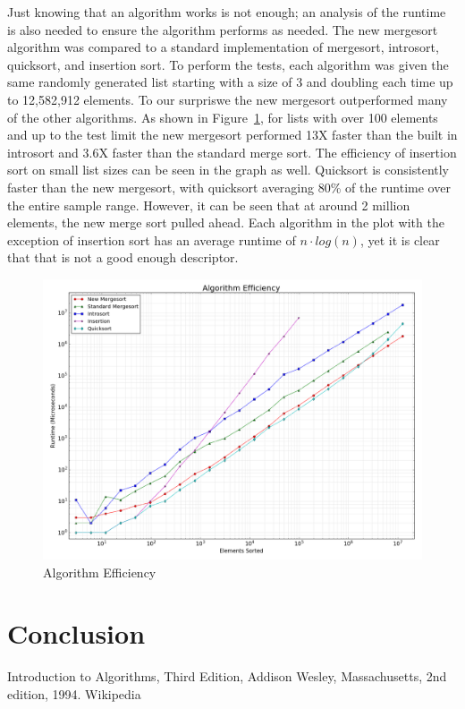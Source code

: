 \documentclass[12pt]{article}
\begin{document}
	Just knowing that an algorithm works is not enough; an analysis of the runtime is also needed to ensure the algorithm performs as needed. 
	The new mergesort algorithm was compared to a standard implementation of mergesort, introsort, quicksort, and insertion sort. 
	To perform the tests, each algorithm was given the same randomly generated list starting with a size of 3 and doubling each time up to 12,582,912 elements. 
	To our surpriswe the new mergesort outperformed many of the other algorithms. 
	As shown in Figure~\ref{fig:algeff}, for lists with over 100 elements and up to the test limit the new mergesort performed 13X faster than the built in introsort and 3.6X faster than the standard merge sort. 
	The efficiency of insertion sort on small list sizes can be seen in the graph as well. Quicksort is consistently faster than the new mergesort, with quicksort averaging 80\% of the runtime over the entire sample range. 
	However, it can be seen that at around 2 million elements, the new merge sort pulled ahead. 
	Each algorithm in the plot with the exception of insertion sort has an average runtime of $ n \cdot log (n) $, yet it is clear that that is not a good enough descriptor.

	\begin{figure}[H]
		\centering
		\includegraphics[width=6in]{figure_3.png}
		\caption{Algorithm Efficiency}
		\label{fig:algeff}
	\end{figure}
	
\section{Conclusion}

\pagebreak


\begin{thebibliography}{9}
	Introduction to Algorithms, Third Edition,
	Addison Wesley, Massachusetts,
	2nd edition,
	1994.
	Wikipedia
	
\end{thebibliography}
\end{document}
